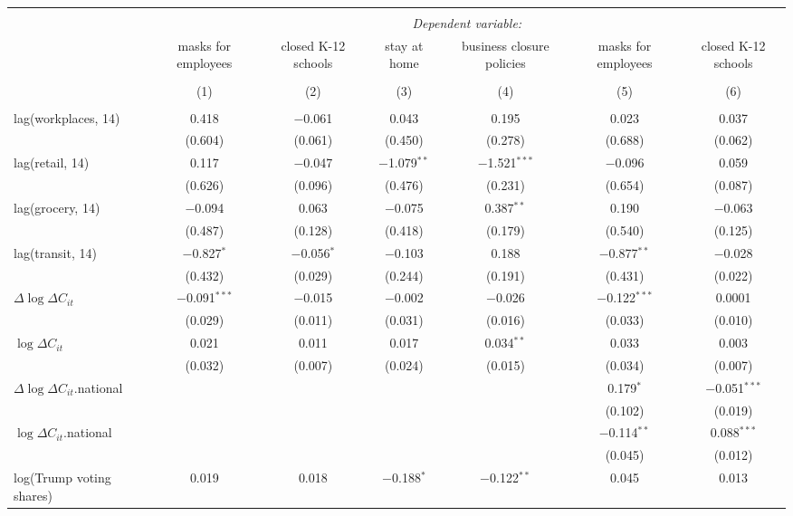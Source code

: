 \begin{tabular}{@{\extracolsep{1pt}}lcccccc} 
\\[-1.8ex]\hline 
\hline \\[-1.8ex] 
 & \multicolumn{6}{c}{\textit{Dependent variable:}} \\ 
\cline{2-7} 
 & masks for employees & closed K-12 schools & stay at home & business closure policies & masks for employees & closed K-12 schools \\ 
\\[-1.8ex] & (1) & (2) & (3) & (4) & (5) & (6)\\ 
\hline \\[-1.8ex] 
 lag(workplaces, 14) & 0.418 & $-$0.061 & 0.043 & 0.195 & 0.023 & 0.037 \\ 
  & (0.604) & (0.061) & (0.450) & (0.278) & (0.688) & (0.062) \\ 
  lag(retail, 14) & 0.117 & $-$0.047 & $-$1.079$^{**}$ & $-$1.521$^{***}$ & $-$0.096 & 0.059 \\ 
  & (0.626) & (0.096) & (0.476) & (0.231) & (0.654) & (0.087) \\ 
  lag(grocery, 14) & $-$0.094 & 0.063 & $-$0.075 & 0.387$^{**}$ & 0.190 & $-$0.063 \\ 
  & (0.487) & (0.128) & (0.418) & (0.179) & (0.540) & (0.125) \\ 
  lag(transit, 14) & $-$0.827$^{*}$ & $-$0.056$^{*}$ & $-$0.103 & 0.188 & $-$0.877$^{**}$ & $-$0.028 \\ 
  & (0.432) & (0.029) & (0.244) & (0.191) & (0.431) & (0.022) \\ 
  $\Delta \log \Delta C_{it}$ & $-$0.091$^{***}$ & $-$0.015 & $-$0.002 & $-$0.026 & $-$0.122$^{***}$ & 0.0001 \\ 
  & (0.029) & (0.011) & (0.031) & (0.016) & (0.033) & (0.010) \\ 
  $\log \Delta C_{it}$ & 0.021 & 0.011 & 0.017 & 0.034$^{**}$ & 0.033 & 0.003 \\ 
  & (0.032) & (0.007) & (0.024) & (0.015) & (0.034) & (0.007) \\ 
  $\Delta \log \Delta C_{it}$.national &  &  &  &  & 0.179$^{*}$ & $-$0.051$^{***}$ \\ 
  &  &  &  &  & (0.102) & (0.019) \\ 
  $\log \Delta C_{it}$.national &  &  &  &  & $-$0.114$^{**}$ & 0.088$^{***}$ \\ 
  &  &  &  &  & (0.045) & (0.012) \\ 
  log(Trump voting shares) & 0.019 & 0.018 & $-$0.188$^{*}$ & $-$0.122$^{**}$ & 0.045 & 0.013 \\ 

\end{tabular}
